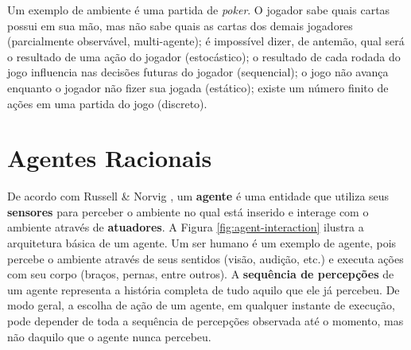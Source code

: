 Um exemplo de ambiente é uma partida de \textit{poker}. O jogador sabe quais
cartas possui em sua mão, mas não sabe quais as cartas dos demais jogadores
(parcialmente observável, multi-agente); é impossível dizer, de antemão, qual
será o resultado de uma ação do jogador (estocástico); o resultado de cada
rodada do jogo influencia nas decisões futuras do jogador (sequencial); o jogo
não avança enquanto o jogador não fizer sua jogada (estático); existe um número
finito de ações em uma partida do jogo (discreto).


\section{\label{section:agents}Agentes Racionais}
De acordo com Russell \& Norvig \cite{RussellNorvig200912}, um \textbf{agente} é
uma entidade que utiliza seus \textbf{sensores} para perceber o ambiente no qual
está inserido e interage com o ambiente através de \textbf{atuadores}. A Figura
\ref{fig:agent-interaction} ilustra a arquitetura básica de um agente. Um ser
humano é um exemplo de agente, pois percebe o ambiente através de seus sentidos
(visão, audição, etc.) e executa ações com seu corpo (braços, pernas, entre
outros). A \textbf{sequência de percepções} de um agente representa a história
completa de tudo aquilo que ele já percebeu. De modo geral, a escolha de ação de
um agente, em qualquer instante de execução, pode depender de toda a sequência
de percepções observada até o momento, mas não daquilo que o agente nunca
percebeu.

